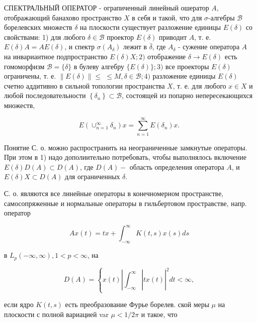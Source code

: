 \documentclass[10pt]{article}
\begin{document}
СПЕКТРАЛЬНЫЙ ОПЕРАТОР - ограпиченный линейный ошератор $A$, отображающий банахово пространство $X$ в себя и такой, что для $\sigma$-алгебры $\mathscr{B}$ борелевских множеств $\delta$ на плоскости существует разложение единицы $E(\delta)$ со свойствами: 1) для любого $\delta \in \mathscr{B}$ проектор $E(\delta)$ приводит $A$, т. е. $E(\delta) A=A E(\delta)$, и спектр $\sigma\left(A_{\delta}\right)$ лежит в $\bar{\delta}$, где $A_{\delta}$ - сужение оператора $A$ на инвариантное подпространство $E(\delta) X ; 2)$ отображение $\delta \rightarrow E(\delta)$ есть гомоморфизм $\mathscr{B}=\{\delta\}$ в булеву алгебру $\{E(\delta)\} ; 3)$ все проекторы $E(\delta)$ ограничены, т. е. $\|E(\delta)\| \leqslant$ $\leqslant M, \delta \in \mathscr{B} ; 4)$ разложение единицы $E(\delta)$ счетно аддитивно в сильной топологии пространства $X$, т. е. для любого $x \in X$ и любой последовательности $\left\{\delta_{n}\right\} \subset \mathscr{B}$, состоящей из попарно непересекающихся множеств,



\[

E\left(\cup_{n=1}^{\infty} \delta_{n}\right) x=\sum_{n=1}^{\infty} E\left(\delta_{n}\right) x .

\]



Понятие С. о. можно распространить на неограниченные замкнутые операторы. При этом в 1) надо дополиительно потребовать, чтобы выполнялось включение $E(\delta) D(A) \subset D(A)$, где $D(A)-$ область определения оператора $A$, и $E(\delta) X \subset D(A)$ для ограниченных $\delta$.



С. о. являются все линейные операторы в конечномерном пространстве, самосопряженные и нормальные операторы в гильбертовом простравстве, напр. оператор



\[

A x(t)=t x+\int_{-\infty}^{\infty} K(t, s) x(s) d s

\]



в $L_{p}(-\infty, \infty), 1<p<\infty$, на



\[

D(A)=\left\{\left.x(t)\left|\int_{-\infty}^{\infty}\right| t x(t)\right|^{2} d t<\infty,\right.

\]



если ядро $K(t, s)$ есть преобразование Фурье борелев. ской меры $\mu$ на плоскости с полной вариацией var $\mu<1 / 2 \pi$ и такое, что
\end{document}
